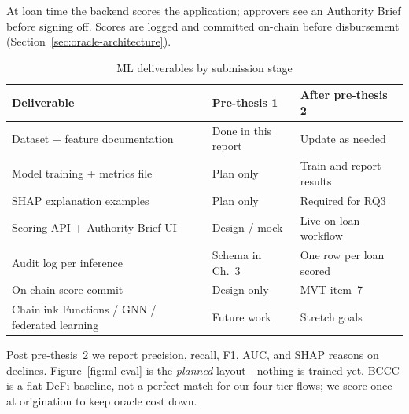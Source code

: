 \documentclass[12pt, a4paper]{report}
\newcommand{\tableheadcolor}{\rowcolor{TableHeadBg}}
\begin{document}
At loan time the backend scores the application; approvers see an Authority Brief before signing off. Scores are logged and committed on-chain before disbursement (Section~\ref{sec:oracle-architecture}).

\begin{table}[H]
\centering
\caption[ML deliverables by submission stage]{ML deliverables by submission stage}
\begin{tabular}{p{4.8cm}p{4.0cm}p{4.4cm}}
\toprule
\tableheadcolor
\textbf{Deliverable} & \textbf{Pre-thesis 1} & \textbf{After pre-thesis 2} \\
\midrule
Dataset + feature documentation & Done in this report & Update as needed \\
Model training + metrics file & Plan only & Train and report results \\
SHAP explanation examples & Plan only & Required for RQ3 \\
Scoring API + Authority Brief UI & Design / mock & Live on loan workflow \\
Audit log per inference & Schema in Ch.~3 & One row per loan scored \\
On-chain score commit & Design only & MVT item~7 \\
Chainlink Functions / GNN / federated learning & Future work & Stretch goals \\
\bottomrule
\end{tabular}
\end{table}

Post pre-thesis~2 we report precision, recall, F1, AUC, and SHAP reasons on declines. Figure~\ref{fig:ml-eval} is the \textit{planned} layout---nothing is trained yet. BCCC is a flat-DeFi baseline, not a perfect match for our four-tier flows; we score once at origination to keep oracle cost down.
\end{document}
